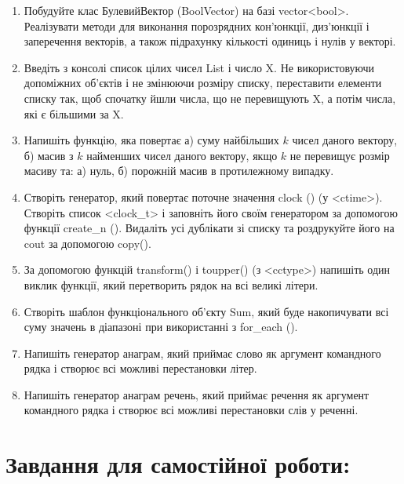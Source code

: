 \documentclass[a5paper,titlepage,openany,twoside,
]
{book_unv}%
\begin{document}
\begin{enumerate}
\def\labelenumi{\arabic{enumi})}

\item
Побудуйте клас БулевийВектор (BoolVector) на базі vector\textless{}bool\textgreater{}. 
Реалізувати методи для виконання порозрядних кон'юнкції, диз'юнкції і 
заперечення векторів, а також підрахунку кількості одиниць і нулів у векторі.
  
\item
  Введіть з консолі список цілих чисел List і число X. Не використовуючи
  допоміжних об'єктів і не змінюючи розміру списку, переставити елементи
  списку так, щоб спочатку йшли числа, що не перевищують X, а потім
  числа, які є більшими за X.

\item
  Напишіть функцію, яка повертає а) суму найбільших $k$ чисел даного
  вектору, б) масив з $k$ найменших чисел даного вектору, якщо $k$ не
  перевищує розмір масиву та: а) нуль, б) порожній масив в протилежному
  випадку.
\item
  Створіть генератор, який повертає поточне значення clock () (у
  \textless{}ctime\textgreater{}). Створіть список
  \textless{}clock\_t\textgreater{} і заповніть його своїм генератором
  за допомогою функції create\_n (). Видаліть усі дублікати зі списку та
  роздрукуйте його на cout за допомогою copy().
\item
  За допомогою функцій transform() і toupper() (з
  \textless{}cctype\textgreater{}) напишіть один виклик функції, який
  перетворить рядок на всі великі літери.
\item
  Створіть шаблон функціонального об'єкту Sum, який буде накопичувати всі
  суму значень в діапазоні при використанні з for\_each ().
\item
  Напишіть генератор анаграм, який приймає слово як аргумент командного
  рядка і створює всі можливі перестановки літер.
\item
  Напишіть генератор анаграм речень, який приймає речення як аргумент
  командного рядка і створює всі можливі перестановки слів у реченні.
\end{enumerate}

\section{Завдання для самостійної роботи:}
\end{document}
